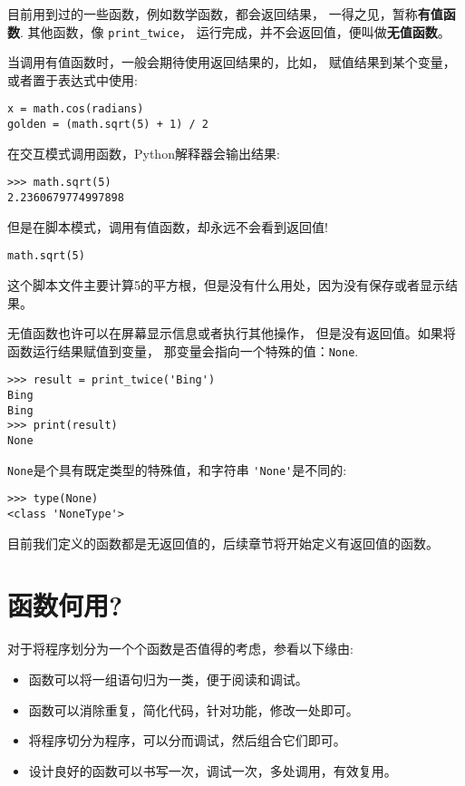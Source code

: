 \documentclass[10pt]{book}
\begin{document}
目前用到过的一些函数，例如数学函数，都会返回结果，
一得之见，暂称{\bf 有值函数}. 其他函数，像 \verb"print_twice"，
运行完成，并不会返回值，便叫做{\bf 无值函数}。

当调用有值函数时，一般会期待使用返回结果的，比如，
赋值结果到某个变量，或者置于表达式中使用:

\begin{verbatim}
x = math.cos(radians)
golden = (math.sqrt(5) + 1) / 2
\end{verbatim}
%
在交互模式调用函数，Python解释器会输出结果:

\begin{verbatim}
>>> math.sqrt(5)
2.2360679774997898
\end{verbatim}
%
但是在脚本模式，调用有值函数，却永远不会看到返回值!

\begin{verbatim}
math.sqrt(5)
\end{verbatim}
%
这个脚本文件主要计算5的平方根，但是没有什么用处，因为没有保存或者显示结果。

无值函数也许可以在屏幕显示信息或者执行其他操作，
但是没有返回值。如果将函数运行结果赋值到变量，
那变量会指向一个特殊的值：{\tt None}.

\begin{verbatim}
>>> result = print_twice('Bing')
Bing
Bing
>>> print(result)
None
\end{verbatim}
%
{\tt None}是个具有既定类型的特殊值，和字符串 \verb"'None'"是不同的:

\begin{verbatim}
>>> type(None)
<class 'NoneType'>
\end{verbatim}
%
目前我们定义的函数都是无返回值的，后续章节将开始定义有返回值的函数。


\section{函数何用?}

对于将程序划分为一个个函数是否值得的考虑，参看以下缘由:

\begin{itemize}

\item 函数可以将一组语句归为一类，便于阅读和调试。

\item 函数可以消除重复，简化代码，针对功能，修改一处即可。

\item 将程序切分为程序，可以分而调试，然后组合它们即可。

\item 设计良好的函数可以书写一次，调试一次，多处调用，有效复用。

\end{itemize}
\end{document}
